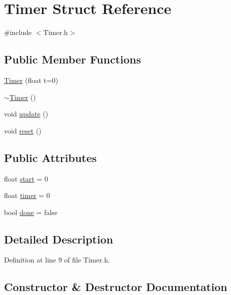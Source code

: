 \hypertarget{struct_timer}{}\section{Timer Struct Reference}
\label{struct_timer}


{\ttfamily \#include $<$Timer.\+h$>$}

\subsection*{Public Member Functions}
\begin{DoxyCompactItemize}
\item 
\hyperlink{struct_timer_a596c0bb8ce30fdad499a62b6653c2e8f}{Timer} (float t=0)
\item 
\hyperlink{struct_timer_a14fa469c4c295c5fa6e66a4ad1092146}{$\sim$\+Timer} ()
\item 
void \hyperlink{struct_timer_a745ad59b5a46744cd871a1129a25d74f}{update} ()
\item 
void \hyperlink{struct_timer_a9020542d73357a4eef512eefaf57524b}{reset} ()
\end{DoxyCompactItemize}
\subsection*{Public Attributes}
\begin{DoxyCompactItemize}
\item 
float \hyperlink{struct_timer_a6b75c3f5ce3277c8bea9c6d9ca96dcd7}{start} = 0
\item 
float \hyperlink{struct_timer_ad6268e1d17cd58eb4caffe2a1e3f00ee}{timer} = 0
\item 
bool \hyperlink{struct_timer_aa460ddd1bec761b68d3b2d460c6e483f}{done} = false
\end{DoxyCompactItemize}


\subsection{Detailed Description}


Definition at line 9 of file Timer.\+h.



\subsection{Constructor \& Destructor Documentation}
\mbox{\label{struct_timer_a596c0bb8ce30fdad499a62b6653c2e8f}} 
